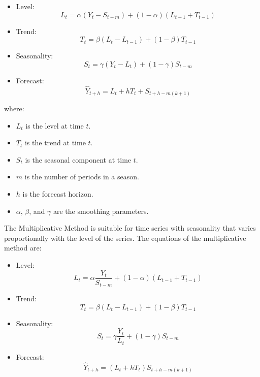 \begin{itemize}
    \item Level:
    \begin{equation}
    L_t = \alpha (Y_t - S_{t-m}) + (1-\alpha)(L_{t-1} + T_{t-1})
    \end{equation}
    \item Trend:
    \begin{equation}
    T_t = \beta (L_t - L_{t-1}) + (1-\beta) T_{t-1}
    \end{equation}
    \item Seasonality:
    \begin{equation}
    S_t = \gamma (Y_t - L_t) + (1-\gamma) S_{t-m}
    \end{equation}
    \item Forecast:
    \begin{equation}
    \hat{Y}_{t+h} = L_t + h T_t + S_{t+h-m(k+1)}
    \end{equation}
\end{itemize}where:
\begin{itemize}
    \item \( L_t \) is the level at time \( t \).
    \item \( T_t \) is the trend at time \( t \).
    \item \( S_t \) is the seasonal component at time \( t \).
    \item \( m \) is the number of periods in a season.
    \item \( h \) is the forecast horizon.
    \item \( \alpha \), \( \beta \), and \( \gamma \) are the smoothing parameters.
\end{itemize}

The Multiplicative Method is suitable for time series with seasonality that varies proportionally with the level of the series. The equations of the multiplicative method are:

\begin{itemize}
    \item Level:
    \begin{equation}
    L_t = \alpha \frac{Y_t}{S_{t-m}} + (1-\alpha)(L_{t-1} + T_{t-1})
    \end{equation}
    \item Trend:
    \begin{equation}
    T_t = \beta (L_t - L_{t-1}) + (1-\beta) T_{t-1}
    \end{equation}
    \item Seasonality:
    \begin{equation}
    S_t = \gamma \frac{Y_t}{L_t} + (1-\gamma) S_{t-m}
    \end{equation}
    \item Forecast:
    \begin{equation}
    \hat{Y}_{t+h} = (L_t + h T_t) S_{t+h-m(k+1)}
    \end{equation}
\end{itemize}
\vspace{10pt}

